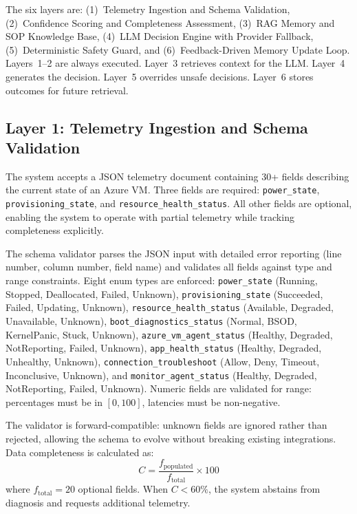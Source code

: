 \documentclass[a4paper,10pt,journal,compsoc]{IEEEtran}
\begin{document}
The six layers are: (1)~Telemetry Ingestion and Schema Validation,
(2)~Confidence Scoring and Completeness Assessment, (3)~RAG Memory and
SOP Knowledge Base, (4)~LLM Decision Engine with Provider Fallback,
(5)~Deterministic Safety Guard, and (6)~Feedback-Driven Memory Update Loop.
Layers~1--2 are always executed. Layer~3 retrieves context for the LLM.
Layer~4 generates the decision. Layer~5 overrides unsafe decisions.
Layer~6 stores outcomes for future retrieval.

\subsection{Layer 1: Telemetry Ingestion and Schema Validation}

The system accepts a JSON telemetry document containing 30+ fields
describing the current state of an Azure VM. Three fields are required:
\texttt{power\_state}, \texttt{provisioning\_state}, and
\texttt{resource\_health\_status}. All other fields are optional,
enabling the system to operate with partial telemetry while tracking
completeness explicitly.

The schema validator parses the JSON input with detailed error
reporting (line number, column number, field name) and validates all
fields against type and range constraints. Eight enum types are
enforced: \texttt{power\_state} (Running, Stopped, Deallocated, Failed,
Unknown), \texttt{provisioning\_state} (Succeeded, Failed, Updating,
Unknown), \texttt{resource\_health\_status} (Available, Degraded,
Unavailable, Unknown), \texttt{boot\_diagnostics\_status} (Normal,
BSOD, KernelPanic, Stuck, Unknown), \texttt{azure\_vm\_agent\_status}
(Healthy, Degraded, NotReporting, Failed, Unknown),
\texttt{app\_health\_status} (Healthy, Degraded, Unhealthy, Unknown),
\texttt{connection\_troubleshoot} (Allow, Deny, Timeout, Inconclusive,
Unknown), and \texttt{monitor\_agent\_status} (Healthy, Degraded,
NotReporting, Failed, Unknown). Numeric fields are validated for range:
percentages must be in $[0, 100]$, latencies must be non-negative.

The validator is forward-compatible: unknown fields are ignored rather
than rejected, allowing the schema to evolve without breaking existing
integrations. Data completeness is calculated as:
\begin{equation}
  C = \frac{f_{\text{populated}}}{f_{\text{total}}} \times 100
  \label{eq:completeness}
\end{equation}
where $f_{\text{total}} = 20$ optional fields. When $C < 60\%$, the
system abstains from diagnosis and requests additional telemetry.
\end{document}
